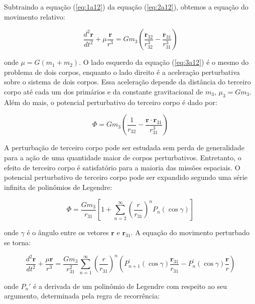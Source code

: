 \par Subtraindo a equação (\ref{eq:1a12}) da equação (\ref{eq:2a12}), obtemos a equação do movimento relativo:

\begin{equation}
\frac{d^2\mathbf{r}}{dt^2}+\mu\frac{\mathbf{r}}{r^3}=Gm_3\left(\frac{\mathbf{r}_{32}}{r_{32}^3}-\frac{\mathbf{r}_{31}}{r_{31}^3}\right)
\label{eq:3a12}
\end{equation}

onde $\mu = G(m_1 + m_2)$. O lado esquerdo da equação (\ref{eq:3a12}) é o mesmo do problema de dois corpos, enquanto o lado direito é a aceleração perturbativa sobre o sistema de dois corpos. Essa aceleração depende da distância do terceiro corpo até cada um dos primários e da constante gravitacional de $m_3$, $\mu_3 = Gm_3$. Além do mais, o potencial perturbativo do terceiro corpo é dado por:

\begin{equation}
\Phi=Gm_3\left(\frac{1}{r_{32}}-\frac{\mathbf{r}\cdot\mathbf{r}_{31}}{r_{31}^3}\right)
\label{eq:7a12}
\end{equation}

\par A perturbação de terceiro corpo pode ser estudada sem perda de generalidade para a ação de uma quantidade maior de corpos perturbativos. Entretanto, o efeito de terceiro corpo é satisfatório para a maioria das missões espaciais. O potencial perturbativo de terceiro corpo pode ser expandido segundo uma série infinita de polinômios de Legendre:

\begin{equation}
\Phi=\frac{G m_3}{r_{31}}\left[1+\sum_{n=2}^\infty\left(\frac{r}{r_{31}}\right)^n P_n(\cos\gamma)\right]
\label{eq:8a12}
\end{equation}

onde $\gamma$ é o ângulo entre os vetores $\mathbf{r}$ e $\mathbf{r}_{31}$. A equação do movimento perturbado se torna:

\begin{equation}
\frac{d^{2}\mathbf{r}}{d t^{2}}+\frac{\mu\mathbf{r}}{r^{3}}=\frac{G m_{3}}{r_{31}^{2}}\sum_{n=1}^{\infty}\left(\frac{r}{r_{31}}\right)^{n}\left(P_{n+1}^{\prime}(\cos\gamma)\frac{\mathbf{r}_{31}}{r_{31}}-P_{n}^{\prime}(\cos\gamma)\frac{\mathbf{r}}{r}\right)
\label{eq:9a12}
\end{equation}

onde $P_n'$ é a derivada de um polinômio de Legendre com respeito ao seu argumento, determinada pela regra de recorrência:

